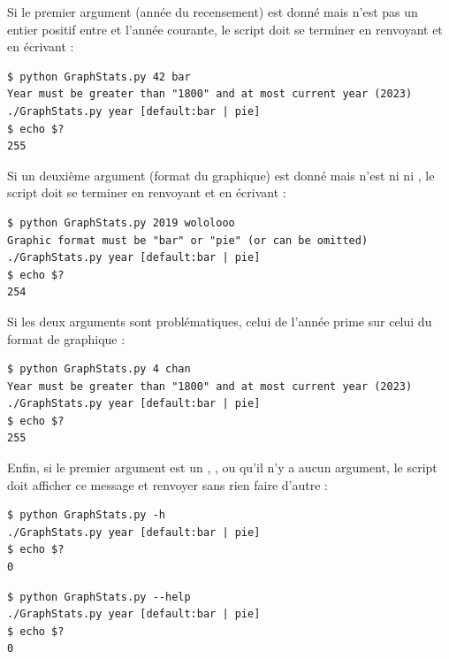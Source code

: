 \bigskip

\noindent Si le premier argument (année du recensement) est donné mais n'est pas un entier positif entre  et l'année courante, le script doit se terminer en renvoyant  et en écrivant :

\bigskip

\lstset{language=sh}
\begin{lstlisting}[frame=single]
$ python GraphStats.py 42 bar
Year must be greater than "1800" and at most current year (2023)
./GraphStats.py year [default:bar | pie]
$ echo $?
255
\end{lstlisting}



\noindent Si un deuxième argument (format du graphique) est donné mais n'est ni  ni , le script doit se terminer en renvoyant  et en écrivant :

\bigskip

\lstset{language=sh}
\begin{lstlisting}[frame=single]
$ python GraphStats.py 2019 wololooo
Graphic format must be "bar" or "pie" (or can be omitted)
./GraphStats.py year [default:bar | pie]
$ echo $?
254
\end{lstlisting}


\clearpage


\noindent Si les deux arguments sont problématiques, celui de l'année prime sur celui du format de graphique :

\bigskip

\lstset{language=sh}
\begin{lstlisting}[frame=single]
$ python GraphStats.py 4 chan
Year must be greater than "1800" and at most current year (2023)
./GraphStats.py year [default:bar | pie]
$ echo $?
255
\end{lstlisting}


\noindent Enfin, si le premier argument est un , , ou qu'il n'y a aucun argument, le script doit afficher ce message et renvoyer  sans rien faire d'autre :

\bigskip

\lstset{language=sh}
\begin{lstlisting}[frame=single]
$ python GraphStats.py -h
./GraphStats.py year [default:bar | pie]
$ echo $?
0
\end{lstlisting}

\lstset{language=sh}
\begin{lstlisting}[frame=single]
$ python GraphStats.py --help
./GraphStats.py year [default:bar | pie]
$ echo $?
0
\end{lstlisting}

